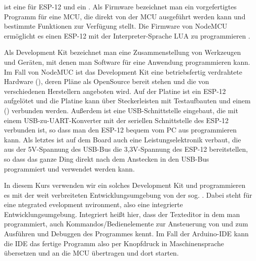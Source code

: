  ist eine  für ESP-12 und ein . Als Firmware bezeichnet man ein vorgefertigtes Programm für eine MCU, 
die direkt von der MCU ausgeführt werden kann und bestimmte Funktionen zur Verfügung stellt. 
Die Firmware von NodeMCU ermöglicht es einen ESP-12 mit der Interpreter-Sprache LUA zu programmieren . 

Als Development Kit bezeichnet man eine Zusammenstellung von Werkzeugen und Geräten, mit denen man Software für eine Anwendung programmieren kann.
Im Fall von NodeMUC ist das Development Kit eine betriebsfertig verdrahtete Hardware (), deren Pläne als OpenSource bereit stehen und die
von verschiedenen Herstellern angeboten wird. Auf der Platine ist ein ESP-12 aufgelötet und die Platine kann über Steckerleisten mit Testaufbauten und einem
 () verbunden werden. Außerdem ist eine USB-Schnittstelle eingebaut, die mit einem USB-zu-UART-Konverter mit der 
seriellen Schnittstelle des ESP-12 verbunden ist, so dass man den ESP-12 bequem vom PC aus programmieren kann. Als letztes ist auf dem Board auch eine 
Leistungselektronik verbaut, die aus der 5V-Spannung des USB-Bus die 3,3V-Spannung des ESP-12 bereitstellen, so dass das ganze Ding direkt nach dem Anstecken
in den USB-Bus programmiert und verwendet werden kann.

In diesem Kurs verwenden wir ein solches Development Kit und programmieren es mit der weit verbreiteten Entwicklungsumgebung von  
 der sog. . Dabei steht  für eine ntegrated evelopment nvironment, 
also eine integrierte Entwicklungsumgebung. Integriert heißt hier, dass der Texteditor in dem man programmiert, auch Kommandos/Bedienelemente zur 
Ansteuerung von   und zum Ausführen und Debuggen des Programmes kennt. Im Fall der Arduino-IDE kann die IDE 
das fertige Programm also per Knopfdruck in Maschinensprache übersetzen und an die MCU übertragen und dort starten.

